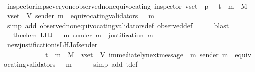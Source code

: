 \begin{isabellebody}
\ \ \ \ \isamarkupfalse%
\ inspector{\isacharunderscore}imps{\isacharunderscore}everyone{\isacharunderscore}observed{\isacharunderscore}non{\isacharunderscore}equivocating\ {\isacartoucheopen}inspector\ {\isacharparenleft}v{\isacharunderscore}set{\isacharcomma}\ {\isasymsigma}{\isacharcomma}\ p{\isacharparenright}{\isacartoucheclose}\ {\isacartoucheopen}{\isasymsigma}\ {\isasymin}\ {\isasymSigma}t\ {\isasymand}\ m\ {\isasymin}\ M\ {\isasymand}\ v{\isacharunderscore}set\ {\isasymsubseteq}\ V{\isacartoucheclose}\ {\isacartoucheopen}sender\ m\ {\isasymnotin}\ equivocating{\isacharunderscore}validators\ {\isacharparenleft}{\isasymsigma}\ {\isasymunion}\ {\isacharbraceleft}m{\isacharbraceright}{\isacharparenright}{\isacartoucheclose}\isanewline
\ \ \ \ \isamarkupfalse%
\ {\isacharparenleft}simp\ add{\isacharcolon}\ observed{\isacharunderscore}non{\isacharunderscore}equivocating{\isacharunderscore}validators{\isacharunderscore}def\ observed{\isacharunderscore}def{\isacharparenright}\isanewline
\ \ \ \ \isamarkupfalse%
\ blast\ \ \ \ \isanewline
\ \ \isamarkupfalse%
\ \isamarkupfalse%
\ {\isachardoublequoteopen}the{\isacharunderscore}elem\ {\isacharparenleft}L{\isacharunderscore}H{\isacharunderscore}J\ {\isacharparenleft}{\isasymsigma}\ {\isasymunion}\ {\isacharbraceleft}m{\isacharbraceright}{\isacharparenright}\ {\isacharparenleft}sender\ m{\isacharparenright}{\isacharparenright}\ {\isacharequal}\ justification\ m{\isachardoublequoteclose}\isanewline
\ \ \ \ \isamarkupfalse%
\ new{\isacharunderscore}justification{\isacharunderscore}is{\isacharunderscore}L{\isacharunderscore}H{\isacharunderscore}J{\isacharunderscore}of{\isacharunderscore}sender\isanewline
\ \ \ \ \ \ \ \ \ \ {\isacartoucheopen}{\isasymsigma}\ {\isasymin}\ {\isasymSigma}t\ {\isasymand}\ m\ {\isasymin}\ M\ {\isasymand}\ v{\isacharunderscore}set\ {\isasymsubseteq}\ V{\isacartoucheclose}\ {\isacartoucheopen}immediately{\isacharunderscore}next{\isacharunderscore}message\ {\isacharparenleft}{\isasymsigma}{\isacharcomma}\ m{\isacharparenright}{\isacartoucheclose}\ {\isacartoucheopen}sender\ m\ {\isasymnotin}\ equivocating{\isacharunderscore}validators\ {\isacharparenleft}{\isasymsigma}\ {\isasymunion}\ {\isacharbraceleft}m{\isacharbraceright}{\isacharparenright}{\isacartoucheclose}\isanewline
\ \ \ \ \isamarkupfalse%
\ {\isacharparenleft}simp\ add{\isacharcolon}\ {\isasymSigma}t{\isacharunderscore}def{\isacharparenright}\ \ \isanewline
\ \ \isanewline
\ \ \isamarkupfalse%

\end{isabellebody}

